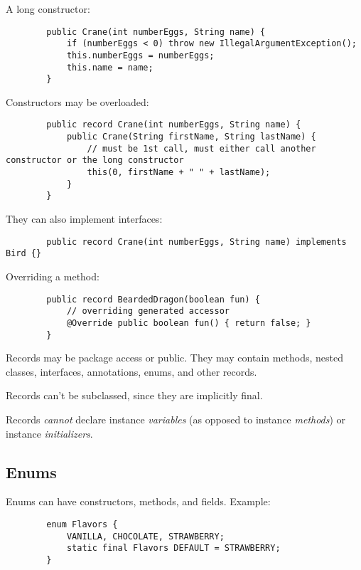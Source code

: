\documentclass{scrartcl}
\begin{document}
    A long constructor:

    \begin{lstlisting}
        public Crane(int numberEggs, String name) {
            if (numberEggs < 0) throw new IllegalArgumentException();
            this.numberEggs = numberEggs;
            this.name = name;
        }
    \end{lstlisting}

    Constructors may be overloaded:

    \begin{lstlisting}
        public record Crane(int numberEggs, String name) {
            public Crane(String firstName, String lastName) {
                // must be 1st call, must either call another constructor or the long constructor
                this(0, firstName + " " + lastName);
            }
        }
    \end{lstlisting}

    They can also implement interfaces:

    \begin{lstlisting}
        public record Crane(int numberEggs, String name) implements Bird {}
    \end{lstlisting}

    Overriding a method:

     \begin{lstlisting}
        public record BeardedDragon(boolean fun) {
            // overriding generated accessor
            @Override public boolean fun() { return false; }
        }
    \end{lstlisting}

    Records may be package access or public. They may contain methods, nested classes, interfaces, annotations, enums, and other records.

    Records can't be subclassed, since they are implicitly final.

    Records \textit{cannot} declare instance \textit{variables} (as opposed to instance \textit{methods}) or instance \textit{initializers}.

\subsection{Enums}

    Enums can have constructors, methods, and fields. Example:

        \begin{lstlisting}
        enum Flavors {
            VANILLA, CHOCOLATE, STRAWBERRY;
            static final Flavors DEFAULT = STRAWBERRY;
        }
    \end{lstlisting}
\end{document}
